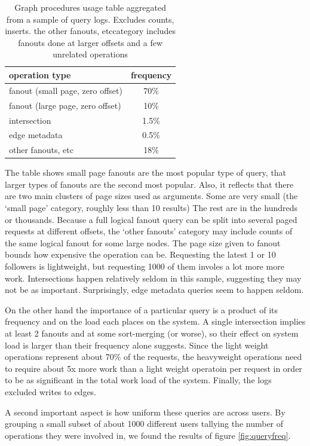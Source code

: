 \newcommand{\other}{other fanouts, etc}

\begin{table}[h!]
\centering
\caption{Graph procedures usage table aggregated from a sample of query logs. Excludes counts, inserts. the \other category includes fanouts done at larger offsets and a few unrelated operations} 
\label{table:workload}
\begin{tabular}{l|c}
operation type & frequency \\
\hline
fanout (small page, zero offset) & 70\% \\
fanout (large page, zero offset) & 10\% \\
intersection & 1.5\% \\
edge metadata & 0.5\%\\
\other & 18\%\\
\end{tabular}
\end{table}

 The table shows small page fanouts are the most popular type of query,  that larger types of fanouts are the second most popular. Also, it reflects that there are two main clusters of page sizes used as arguments. Some are very small (the `small page' category, roughly less than 10 results) The rest are in the hundreds or thousands. Because a full logical fanout query can be split into several paged requests at different offsets, the `other fanouts' category may include counts of the same logical fanout for some large nodes.   The page size given to fanout bounds how expensive the operation can be. Requesting the latest 1 or 10 followers is lightweight, but requesting 1000 of them  involes a lot more more work. Intersections happen relatively seldom in this sample, suggesting they may not be as important.  Surprisingly, edge metadata queries seem to happen seldom.

On the other hand the importance of a particular query is a product of its frequency and on the load each places on the system. A single intersection implies at least 2 fanouts and at some sort-merging (or worse), so their effect on system load is larger than their frequency alone suggests. Since the light weight operations represent about 70\% of the requests, the heavyweight operations need to require about 5x more work than a light weight operatoin per request in order to be as significant in the total work load of the system. Finally, the logs excluded writes to edges.

A second important aspect is how uniform these queries are across users. By grouping a small subset of about 1000 different users tallying the number of operations they were involved in, we found the results of figure \ref{fig:queryfreq}.

